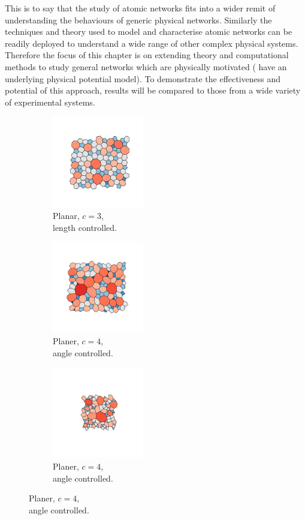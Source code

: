 This is to say that the study of atomic networks fits into a wider remit of understanding the behaviours of generic physical networks.
Similarly the techniques and theory used to model and characterise atomic networks can be readily deployed to understand a wide range of other complex physical systems.
Therefore the focus of this chapter is on extending theory and computational methods to study general \td{} networks which are physically motivated (\ie{} have an underlying physical potential model). 
To demonstrate the effectiveness and potential of this approach, results will be compared to those from a wide variety of experimental systems.

\begin{figure}[bt]
     \centering
     
      \begin{subfigure}[b]{0.25\textwidth}
         \centering
         \includegraphics[height=4cm]{./figures/general_networks/silica.pdf}
         \caption{Planar, $c=3$, \\ length controlled.}
         \label{fig:ne1}
     \end{subfigure}
     \hfill
     \begin{subfigure}[b]{0.25\textwidth}
         \centering
         \includegraphics[height=4cm]{./figures/general_networks/foam.pdf}
         \caption{Planer, $c=4$, \\ angle controlled.}
         \label{fig:ne2}
     \end{subfigure}
     \hfill
     \begin{subfigure}[b]{0.25\textwidth}
         \centering
         \includegraphics[height=4cm]{./figures/general_networks/four.pdf}
         \caption{Planer, $c=4$, \\ angle controlled.}
         \label{fig:ne3}
     \end{subfigure}
     \hfill
     

\end{figure}
